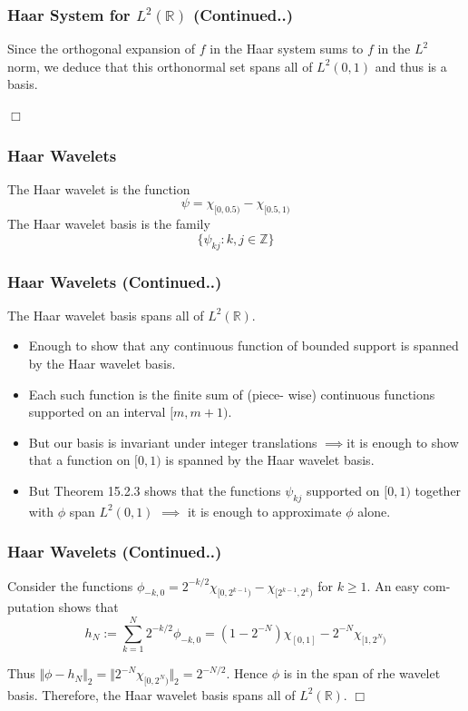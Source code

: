 \documentclass{beamer}
\newcommand{\qedwhite}{\hfill \ensuremath{\Box}}
\begin{document}
\begin{frame}
    \frametitle{Haar System for  $L^2\left({\mathbb{R}}\right)$ (Continued..)}
    Since the orthogonal expansion of $f$ in the Haar system sums to $f $ in the $L^2$ norm,
we deduce that this orthonormal set spans all of $L^2(0,1)$ and thus is a basis.

\qedwhite

\end{frame}

\begin{frame}
\frametitle{Haar Wavelets}

\begin{definition}[15.2.4]
    The Haar wavelet is the function $$\psi = \chi_{[0, 0.5)} - \chi_{[0.5, 1)}$$
    The Haar wavelet basis is the family $$\{\psi_{kj}: k,j \in \mathbb{Z} \}$$
\end{definition}

\end{frame}

\begin{frame}
\frametitle{Haar Wavelets (Continued..)}

\begin{theorem}[15.2.5]
    The Haar wavelet basis spans all of $L^2(\mathbb{R})$.
\end{theorem}

\linebreak
\begin{itemize}
    \item Enough to show that any continuous function of bounded support is spanned by the Haar wavelet basis. 
    \item Each such function is the finite sum of (piece- wise) continuous functions supported on an interval $[m,m+1)$.
    \item But our basis is invariant under integer translations $\implies$it is enough to show that a function on $[0, 1)$ is spanned by the Haar wavelet basis.
    \item But Theorem 15.2.3 shows that the functions $\psi_{kj}$ supported on $[0,1)$ together with $\phi$ span $L^2(0,1)$ $\implies$ it is enough to approximate $\phi$ alone.
\end{itemize}    

\end{frame}

\begin{frame}
    \frametitle{Haar Wavelets (Continued..)}

    Consider the functions $\phi_{-k,0} = 2^{-k/2}\chi_{[0,2^{k-1})}-\chi_{[2^{k-1}, 2^k)}$ for $k \ge 1$. An easy com- putation shows that
    $$h_N := \sum_{k=1}^{N}2^{-k/2}\phi_{-k,0} = (1-2^{-N})\chi_{[0, 1]} - 2^{-N}\chi_{[1,2^N)}$$

        Thus $\Vert \phi - h_N \Vert_2 = \Vert 2^{-N}\chi_{[0,2^N)}\Vert_2 = 2^{-N/2}$. Hence $\phi$ is in the span of rhe wavelet
        basis. Therefore, the Haar wavelet basis spans all of $L^2(\mathbb{R})$.
        \qedwhite

    \end{frame}
\end{document}
